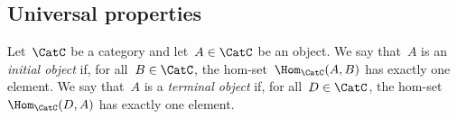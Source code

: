 \subsection{Universal properties}



\begin{shaded*}
\begin{definition}
Let~$\CatC$ be a category and let~$A \in \CatC$ be an object. We say that~$A$ is an \emph{initial object} if, for all~$B \in\CatC$, the hom-set~$\Hom_\CatC(A,B)$ has exactly one element. We say that~$A$ is a \emph{terminal object} if, for all~$D\in\CatC$, the hom-set~$\Hom_\CatC(D,A)$ has exactly one element.
\end{definition}
\end{shaded*}
